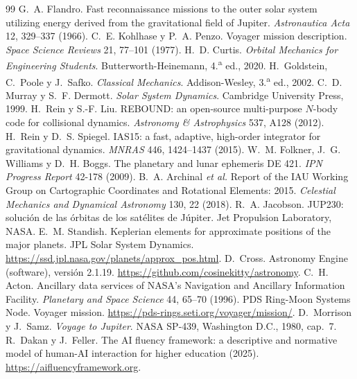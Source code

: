 \documentclass[11pt,letterpaper]{article}
\begin{document}
\begin{thebibliography}{99}\small\setlength{\itemsep}{0pt}
 G.~A. Flandro. Fast reconnaissance missions to the outer solar system
utilizing energy derived from the gravitational field of Jupiter. \emph{Astronautica Acta}
12, 329--337 (1966).
 C.~E. Kohlhase y P.~A. Penzo. Voyager mission description.
\emph{Space Science Reviews} 21, 77--101 (1977).
 H.~D. Curtis. \emph{Orbital Mechanics for Engineering Students}.
Butterworth-Heinemann, 4.\textsuperscript{a} ed., 2020.
 H.~Goldstein, C.~Poole y J.~Safko. \emph{Classical Mechanics}.
Addison-Wesley, 3.\textsuperscript{a} ed., 2002.
 C.~D. Murray y S.~F. Dermott. \emph{Solar System Dynamics}.
Cambridge University Press, 1999.
 H.~Rein y S.-F. Liu. REBOUND: an open-source multi-purpose $N$-body code
for collisional dynamics. \emph{Astronomy \& Astrophysics} 537, A128 (2012).
 H.~Rein y D.~S. Spiegel. IAS15: a fast, adaptive, high-order integrator
for gravitational dynamics. \emph{MNRAS} 446, 1424--1437 (2015).
 W.~M. Folkner, J.~G. Williams y D.~H. Boggs. The planetary and lunar
ephemeris DE 421. \emph{IPN Progress Report} 42-178 (2009).
 B.~A. Archinal \emph{et al.} Report of the IAU Working Group on Cartographic Coordinates and Rotational Elements: 2015. \emph{Celestial Mechanics and Dynamical Astronomy} 130, 22 (2018).
 R.~A. Jacobson. JUP230: solución de las órbitas de los satélites de Júpiter. Jet Propulsion Laboratory, NASA.
 E.~M. Standish. Keplerian elements for approximate positions of the major planets. JPL Solar System Dynamics. \url{https://ssd.jpl.nasa.gov/planets/approx_pos.html}.
 D.~Cross. Astronomy Engine (software), versión 2.1.19.
\url{https://github.com/cosinekitty/astronomy}.
 C.~H. Acton. Ancillary data services of NASA's Navigation and Ancillary
Information Facility. \emph{Planetary and Space Science} 44, 65--70 (1996).
 PDS Ring-Moon Systems Node. Voyager mission.
\url{https://pds-rings.seti.org/voyager/mission/}.
 D.~Morrison y J.~Samz. \emph{Voyage to Jupiter}. NASA SP-439,
Washington D.C., 1980, cap.~7.
 R.~Dakan y J.~Feller. The AI fluency framework: a descriptive and normative
model of human-AI interaction for higher education (2025). \url{https://aifluencyframework.org}.
\end{thebibliography}
\end{document}
